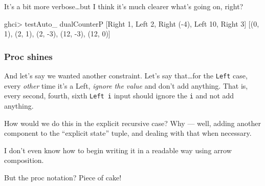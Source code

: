 \documentclass[]{article}
\newenvironment{Shaded}{}{}
\newcommand{\DataTypeTok}[1]{\textcolor[rgb]{0.56,0.13,0.00}{#1}}
\newcommand{\DecValTok}[1]{\textcolor[rgb]{0.25,0.63,0.44}{#1}}
\newcommand{\NormalTok}[1]{#1}
\newcommand{\OperatorTok}[1]{\textcolor[rgb]{0.40,0.40,0.40}{#1}}
\begin{document}
It's a bit more verbose\ldots but I think it's much clearer what's going on,
right?

\begin{Shaded}
\begin{Highlighting}[]
\NormalTok{ghci}\OperatorTok{\textgreater{}}\NormalTok{ testAuto\_ dualCounterP [}\DataTypeTok{Right} \DecValTok{1}\NormalTok{, }\DataTypeTok{Left} \DecValTok{2}\NormalTok{, }\DataTypeTok{Right}\NormalTok{ (}\OperatorTok{{-}}\DecValTok{4}\NormalTok{), }\DataTypeTok{Left} \DecValTok{10}\NormalTok{, }\DataTypeTok{Right} \DecValTok{3}\NormalTok{]}
\NormalTok{[(}\DecValTok{0}\NormalTok{, }\DecValTok{1}\NormalTok{), (}\DecValTok{2}\NormalTok{, }\DecValTok{1}\NormalTok{), (}\DecValTok{2}\NormalTok{, }\OperatorTok{{-}}\DecValTok{3}\NormalTok{), (}\DecValTok{12}\NormalTok{, }\OperatorTok{{-}}\DecValTok{3}\NormalTok{), (}\DecValTok{12}\NormalTok{, }\DecValTok{0}\NormalTok{)]}
\end{Highlighting}
\end{Shaded}

\subsubsection{Proc shines}\label{proc-shines}

And let's say we wanted another constraint. Let's say that\ldots for the
\texttt{Left} case, every \emph{other} time it's a Left, \emph{ignore the value}
and don't add anything. That is, every second, fourth, sixth \texttt{Left\ i}
input should ignore the \texttt{i} and not add anything.

How would we do this in the explicit recursive case? Why --- well, adding
another component to the ``explicit state'' tuple, and dealing with that when
necessary.

I don't even know how to begin writing it in a readable way using arrow
composition.

But the proc notation? Piece of cake!
\end{document}
